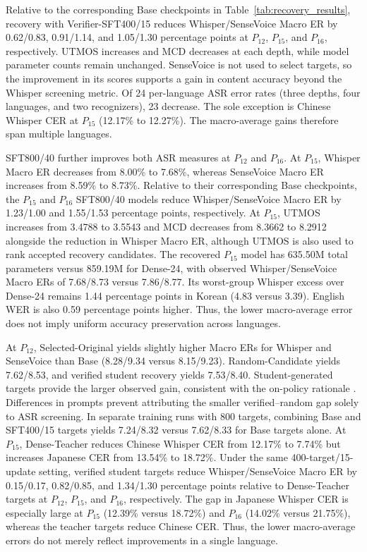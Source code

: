 \documentclass{article}
\begin{document}
Relative to the corresponding Base checkpoints in
Table~\ref{tab:recovery_results}, recovery with Verifier-SFT400/15 reduces
Whisper/SenseVoice Macro ER by 0.62/0.83, 0.91/1.14, and 1.05/1.30
percentage points at \(P_{12}\), \(P_{15}\), and \(P_{16}\),
respectively. UTMOS increases and MCD decreases at each depth, while
model parameter counts remain unchanged. SenseVoice is not used to
select targets, so the improvement in its scores supports a gain in
content accuracy beyond the Whisper screening metric. Of 24
per-language ASR error rates (three depths, four languages, and two
recognizers), 23 decrease. The sole exception is Chinese Whisper CER
at \(P_{15}\) (12.17\% to 12.27\%). The macro-average gains
therefore span multiple languages.

SFT800/40 further improves both ASR measures at \(P_{12}\) and
\(P_{16}\). At \(P_{15}\), Whisper Macro ER decreases from 8.00\%
to 7.68\%, whereas SenseVoice Macro ER increases from 8.59\% to
8.73\%. Relative to their corresponding Base checkpoints, the
\(P_{15}\) and \(P_{16}\) SFT800/40 models reduce Whisper/SenseVoice
Macro ER by 1.23/1.00 and 1.55/1.53 percentage points, respectively.
At \(P_{15}\), UTMOS increases from 3.4788 to 3.5543 and MCD
decreases from 8.3662 to 8.2912 alongside the reduction in Whisper
Macro ER, although UTMOS is also used to rank accepted recovery
candidates. The recovered \(P_{15}\) model has 635.50M total
parameters versus 859.19M for Dense-24, with observed
Whisper/SenseVoice Macro ERs of 7.68/8.73 versus 7.86/8.77.
Its worst-group Whisper excess
over Dense-24 remains 1.44 percentage points in Korean (4.83 versus
3.39). English WER is also 0.59 percentage points higher. Thus, the
lower macro-average error does not imply uniform accuracy
preservation across languages.

At \(P_{12}\), Selected-Original yields slightly higher Macro ERs
for Whisper and SenseVoice than Base (8.28/9.34 versus 8.15/9.23).
Random-Candidate yields 7.62/8.53, and verified student recovery
yields 7.53/8.40. Student-generated targets provide the larger
observed gain, consistent with the on-policy rationale
\cite{agarwal2024onpolicy}. Differences in prompts prevent attributing
the smaller verified--random gap solely to ASR screening.
In separate training runs with 800 targets, combining Base and
SFT400/15 targets yields 7.24/8.32 versus 7.62/8.33 for Base targets alone.
At \(P_{15}\), Dense-Teacher reduces Chinese Whisper CER from
12.17\% to 7.74\% but increases Japanese CER from 13.54\% to
18.72\%. Under the same 400-target/15-update setting, verified student
targets reduce Whisper/SenseVoice Macro ER by 0.15/0.17, 0.82/0.85,
and 1.34/1.30 percentage points relative to Dense-Teacher targets at
\(P_{12}\), \(P_{15}\), and \(P_{16}\), respectively. The gap in
Japanese Whisper CER is especially large at \(P_{15}\) (12.39\%
versus 18.72\%) and \(P_{16}\) (14.02\% versus 21.75\%), whereas
the teacher targets reduce Chinese CER. Thus, the lower macro-average
errors do not merely reflect improvements in a single language.
\end{document}

